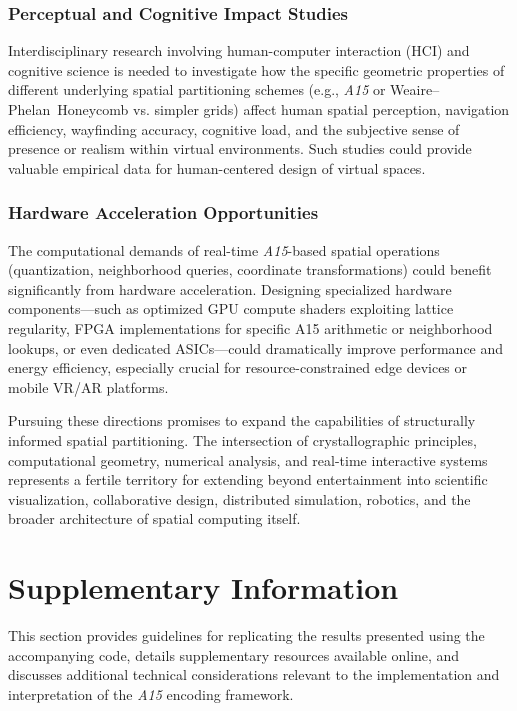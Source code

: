 \documentclass[10pt]{article}
\def\AAAB{\textit{A15}}
\def\WP{Weaire--Phelan}
\def\WPH{\WP{}~Honeycomb}
\begin{document}
\subsubsection{Perceptual and Cognitive Impact Studies}\label{subsubsec-outlook-perception}
Interdisciplinary research involving human-computer interaction (HCI) and cognitive science is needed to investigate how the specific geometric properties of different underlying spatial partitioning schemes (e.g., \AAAB{} or \WPH{} vs. simpler grids) affect human spatial perception, navigation efficiency, wayfinding accuracy, cognitive load, and the subjective sense of presence or realism within virtual environments. Such studies could provide valuable empirical data for human-centered design of virtual spaces.

\subsubsection{Hardware Acceleration Opportunities}\label{subsubsec-outlook-hardware}
The computational demands of real-time \AAAB{}-based spatial operations (quantization, neighborhood queries, coordinate transformations) could benefit significantly from hardware acceleration. Designing specialized hardware components—such as optimized GPU compute shaders exploiting lattice regularity, FPGA implementations for specific A15 arithmetic or neighborhood lookups, or even dedicated ASICs—could dramatically improve performance and energy efficiency, especially crucial for resource-constrained edge devices or mobile VR/AR platforms.

\vspace{\parskip}
Pursuing these directions promises to expand the capabilities of structurally informed spatial partitioning. The intersection of crystallographic principles, computational geometry, numerical analysis, and real-time interactive systems represents a fertile territory for extending beyond entertainment into scientific visualization, collaborative design, distributed simulation, robotics, and the broader architecture of spatial computing itself.

\section{Supplementary Information}\label{sec-supplementary}

This section provides guidelines for replicating the results presented using the accompanying code, details supplementary resources available online, and discusses additional technical considerations relevant to the implementation and interpretation of the \AAAB{} encoding framework.
\end{document}
